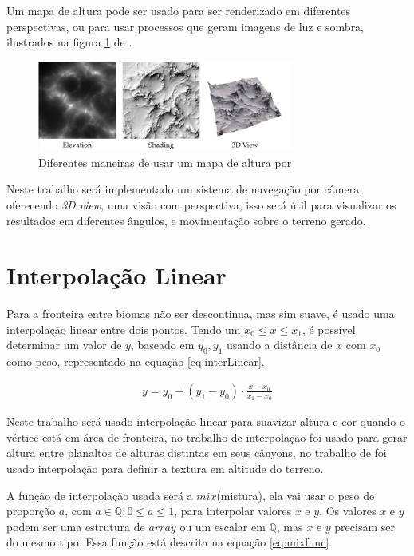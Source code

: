 Um mapa de altura pode ser usado para ser renderizado em diferentes perspectivas,
ou para usar processos que geram imagens de luz e sombra, ilustrados na figura \ref{fig:hmap} de \cite{dachsbacher2006interactive}.
\begin{figure}[H]
    \centering
    \includegraphics[width=0.75\textwidth]{figuras/hmap.png}
    \caption{Diferentes maneiras de usar um mapa de altura por \cite{dachsbacher2006interactive}}
    \label{fig:hmap}
\end{figure}

Neste trabalho será implementado um sistema de navegação por câmera, oferecendo \textit{3D view}, 
uma visão com perspectiva, isso será útil para visualizar os resultados em diferentes
ângulos, e movimentação sobre o terreno gerado.

\section{Interpolação Linear}

Para a fronteira entre biomas não ser descontinua, mas sim suave, é usado uma interpolação linear entre dois pontos.
Tendo um $x_{0} \leq x \leq x_{1}$, é possível determinar um valor de $y$, baseado em $y_{0}, y_{1}$ usando a distância
de $x$ com $x_{0}$ como peso, representado na equação \ref{eq:interLinear}.

\begin{equation}\label{eq:interLinear}
  \begin{split}
    y = y_{0} + (y_{1} - y_{0}) \cdot \frac{x - x_{0}}{x_{1} - x_{0}}
  \end{split}
\end{equation}

Neste trabalho será usado interpolação linear para suavizar altura e cor quando
o vértice está em área de fronteira, no trabalho de \cite{carli2012canion} interpolação 
foi usado para gerar altura entre planaltos de alturas distintas em seus cânyons, no 
trabalho de \cite{fernando2009costas} foi usado interpolação para definir a textura 
em altitude do terreno.

A função de interpolação usada será a $mix$(mistura), ela vai usar o peso de proporção $a$, 
com $a \in \mathbb{Q}: 0 \leq a \leq 1$, para interpolar valores $x$ e $y$. Os valores $x$ e $y$
podem ser uma estrutura de $array$ ou um escalar em $\mathbb{Q}$, mas $x$ e $y$ precisam ser do mesmo tipo.
Essa função está descrita na equação \ref{eq:mixfunc}.

